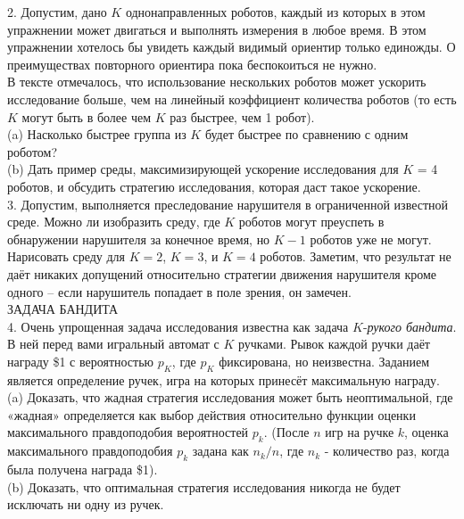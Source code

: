 \documentclass[10pt,a4paper]{article}
\begin{document}
2.	Допустим, дано $K$ однонаправленных роботов, каждый из которых в этом упражнении может двигаться и выполнять измерения в любое время. В этом упражнении хотелось бы увидеть каждый видимый ориентир только единожды. О преимуществах повторного ориентира пока беспокоиться не нужно.\\

В тексте отмечалось, что использование нескольких роботов может ускорить исследование больше, чем на линейный коэффициент количества роботов (то есть $K$ могут быть в более чем $K$ раз быстрее, чем 1 робот).\\

(a)	Насколько быстрее группа из $K$ будет быстрее по сравнению с одним роботом?\\

(b)	Дать пример среды, максимизирующей ускорение исследования для $K$ = 4 роботов, и обсудить стратегию исследования, которая даст такое ускорение.\\

3.	Допустим, выполняется преследование нарушителя в ограниченной известной среде. Можно ли изобразить среду, где $K$ роботов могут преуспеть в обнаружении нарушителя за конечное время, но $K-1$ роботов уже не могут. Нарисовать среду для $K = 2$, $K = 3$, и $K = 4$ роботов. Заметим, что результат не даёт никаких допущений относительно стратегии движения нарушителя кроме одного – если нарушитель попадает в поле зрения, он замечен.\\

ЗАДАЧА БАНДИТА\\

4. Очень упрощенная задача исследования известна как задача $K$-\textit{рукого бандита}. В ней перед вами игральный автомат с $K$ ручками. Рывок каждой ручки даёт награду \$1 с вероятностью $p_K$, где $p_K$ фиксирована, но неизвестна. Заданием является определение ручек, игра на которых принесёт максимальную награду.\\

(a)	Доказать, что жадная стратегия исследования может быть неоптимальной, где «жадная» определяется как выбор действия относительно функции оценки максимального правдоподобия вероятностей $p_k$. (После $n$ игр на ручке $k$, оценка максимального правдоподобия $p_k$ задана как $n_k/n$, где $n_k$  - количество раз, когда была получена награда \$1).\\

(b)	Доказать, что оптимальная стратегия исследования никогда не будет исключать ни одну из ручек.\\
\end{document}
